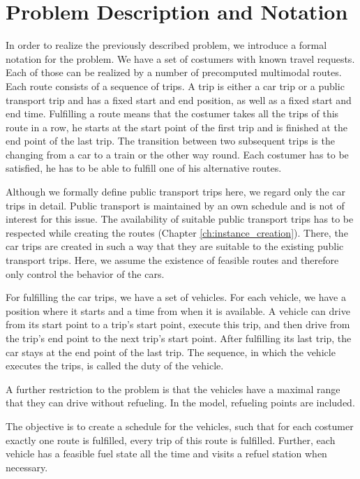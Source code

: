 \section{Problem Description and Notation}
\label{sec:problem_description}

In order to realize the previously described problem, we introduce a formal notation for the problem. We have a set of costumers with known travel requests. Each of those can be realized by a number of precomputed multimodal routes. Each route consists of a sequence of trips. A trip is either a car trip or a public transport trip and has a fixed start and end position, as well as a fixed start and end time. Fulfilling a route means that the costumer takes all the trips of this route in a row, \ie he starts at the start point of the first trip and is finished at the end point of the last trip. The transition between two subsequent trips is the changing from a car to a train or the other way round. Each costumer has to be satisfied, \ie he has to be able to fulfill one of his alternative routes.

Although we formally define public transport trips here, we regard only the car trips in detail. Public transport is maintained by an own schedule and is not of interest for this issue. The availability of suitable public transport trips has to be respected while creating the routes (Chapter \ref{ch:instance_creation}). There, the car trips are created in such a way that they are suitable to the existing public transport trips. Here, we assume the existence of feasible routes and therefore only control the behavior of the cars.

For fulfilling the car trips, we have a set of vehicles. For each vehicle, we have a position where it starts and a time from when it is available. A vehicle can drive from its start point to a trip's start point, execute this trip, and then drive from the trip's end point to the next trip's start point. After fulfilling its last trip, the car stays at the end point of the last trip. The sequence, in which the vehicle executes the trips, is called the duty of the vehicle. 

A further restriction to the problem is that the vehicles have a maximal range that they can drive without refueling. In the model, refueling points are included.

The objective is to create a schedule for the vehicles, such that for each costumer exactly one route is fulfilled, \ie every trip of this route is fulfilled. Further, each vehicle has a feasible fuel state all the time and visits a refuel station when necessary.

